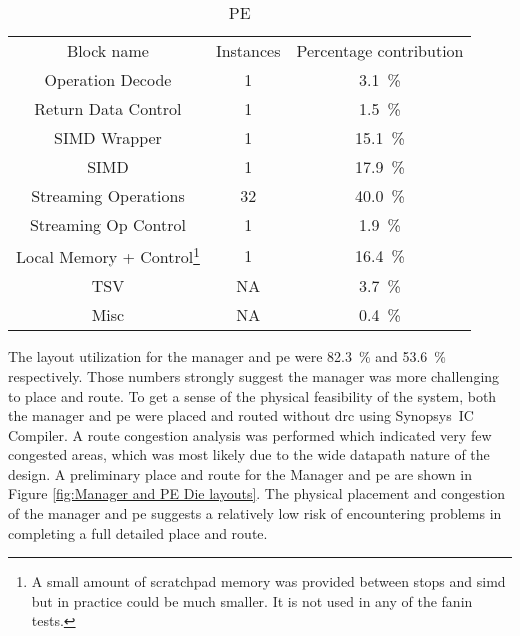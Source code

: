 \begin{table}[h]
\begin{subtable}{1\textwidth}
    \centering
    \begin{adjustbox}{width=0.55\textwidth}
      \begin{tabular}{|c|c|c|}
        \hline
       \multirow{2}{*}{Block name}    &  \multirow{2}{*}{Instances}        &  \multirow{2}{*}{Percentage contribution}     \\  %
                                      &                                    &                                               \\
        \hline  %
     Operation Decode    & 1&\SI[per-mode=symbol]{ 3.1}{\percent}  \\
   Return Data Control   & 1&\SI[per-mode=symbol]{ 1.5}{\percent}  \\
    SIMD Wrapper         & 1&\SI[per-mode=symbol]{15.1}{\percent}  \\
        SIMD             & 1&\SI[per-mode=symbol]{17.9}{\percent}  \\
  Streaming Operations   &32&\SI[per-mode=symbol]{40.0}{\percent}  \\
  Streaming Op Control   & 1&\SI[per-mode=symbol]{ 1.9}{\percent}  \\
 Local Memory + Control\footnote{A small amount of scratchpad memory was provided between \acp{stop} and \ac{simd} but in practice could be much smaller. It is not used in any of the fanin tests.}  & 1&\SI[per-mode=symbol]{16.4}{\percent}  \\ 
        TSV              &NA&\SI[per-mode=symbol]{ 3.7}{\percent}  \\
        Misc             &NA&\SI[per-mode=symbol]{ 0.4}{\percent}  \\
        \hline
      \end{tabular}
    \end{adjustbox}
    \vspace{3pt}
    \captionsetup{justification=centering, skip=10pt}
    \caption{PE}
    \label{tab:PE Area Contribution}
  \end{subtable}
  \end{table}

The layout utilization for the manager and \ac{pe} were \SI{82.3}{\percent} and \SI{53.6}{\percent} respectively.
Those numbers strongly suggest the manager was more challenging to place and route.
To get a sense of the physical feasibility of the system, both the manager and \ac{pe} were placed and routed without \ac{drc} using Synopsys\textregistered ~IC Compiler\texttrademark.
A route congestion analysis was performed which indicated very few congested areas, which was most likely due to the wide datapath nature of the design.
A preliminary place and route for the Manager and \ac{pe} are shown in Figure \ref{fig:Manager and PE Die layouts}. 
The physical placement and congestion of the manager and \ac{pe} suggests a relatively low risk of encountering problems in completing a full detailed place and route.

